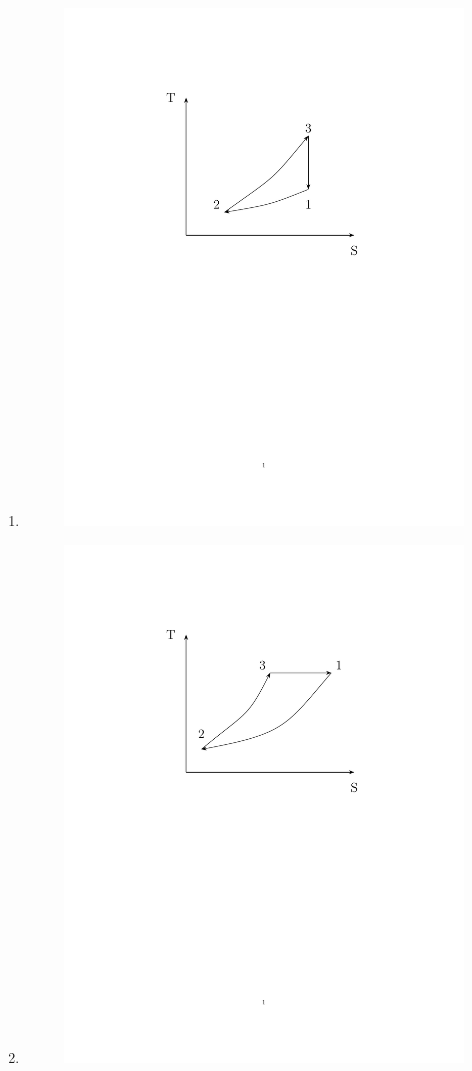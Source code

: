 \documentclass[journal,12pt,onecolumn,article]{IEEEtran}
\theoremstyle{remark}
\begin{document}
\begin{enumerate}
\begin{enumerate}
			\item
					\begin{figure}[H]
						\begin{minipage}{0.5\textwidth}
	\includegraphics[width=0.7\linewidth]{fig/fig74c/main.pdf}
						\end{minipage}
						\vspace{-180pt}
\end{figure}

			\item
					\begin{figure}[H]
						\begin{minipage}{0.5\textwidth}
	\includegraphics[width=0.7\linewidth]{fig/fig74d/main.pdf}
						\end{minipage}
						\vspace{-190pt}
\end{figure}


\end{enumerate}
\end{enumerate}
\end{document}
